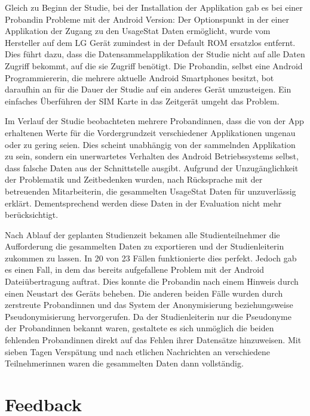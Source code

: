 Gleich zu Beginn der Studie, bei der Installation der Applikation gab es bei einer Probandin Probleme mit der Android Version:
Der Optionspunkt in der einer Applikation der Zugang zu den UsageStat Daten ermöglicht, wurde vom Hersteller auf dem LG Gerät zumindest in der Default ROM ersatzlos entfernt.
Dies führt dazu, dass die Datensammelapplikation der Studie nicht auf alle Daten Zugriff bekommt, auf die sie Zugriff benötigt.
Die Probandin, selbst eine Android Programmiererin, die mehrere aktuelle Android Smartphones besitzt, bot daraufhin an für die Dauer der Studie auf ein anderes Gerät umzusteigen.
Ein einfaches Überführen der SIM Karte in das Zeitgerät umgeht das Problem.
\par
Im Verlauf der Studie beobachteten mehrere Probandinnen,  dass die von der App erhaltenen Werte für die Vordergrundzeit verschiedener Applikationen ungenau oder zu gering seien.
Dies scheint unabhängig von der sammelnden Applikation zu sein, sondern ein unerwartetes Verhalten des Android Betriebssystems selbst, dass falsche Daten aus der Schnittstelle ausgibt.
Aufgrund der Unzugänglichkeit der Problematik und Zeitbedenken wurden, nach Rücksprache mit der betreuenden Mitarbeiterin, die gesammelten UsageStat Daten für unzuverlässig erklärt.
Dementsprechend werden diese Daten in der Evaluation nicht mehr berücksichtigt.
\par
Nach Ablauf der geplanten Studienzeit bekamen alle Studienteilnehmer die Aufforderung die gesammelten Daten zu exportieren und der Studienleiterin zukommen zu lassen. 
In 20 von 23 Fällen funktionierte dies perfekt.
Jedoch gab es einen Fall, in dem das bereits aufgefallene Problem \cite{androidbug} mit der Android Dateiübertragung auftrat.
Dies konnte die Probandin nach einem Hinweis durch einen Neustart des Geräts beheben.
Die anderen beiden Fälle wurden durch zerstreute Probandinnen und das System der Anonymisierung beziehungsweise Pseudonymisierung hervorgerufen.
Da der Studienleiterin nur die Pseudonyme der Probandinnen bekannt waren, gestaltete es sich unmöglich die beiden fehlenden Probandinnen direkt auf das Fehlen ihrer Datensätze hinzuweisen.
Mit sieben Tagen Verspätung und nach etlichen Nachrichten an verschiedene Teilnehmerinnen waren die gesammelten Daten dann vollständig.

\section{Feedback}

